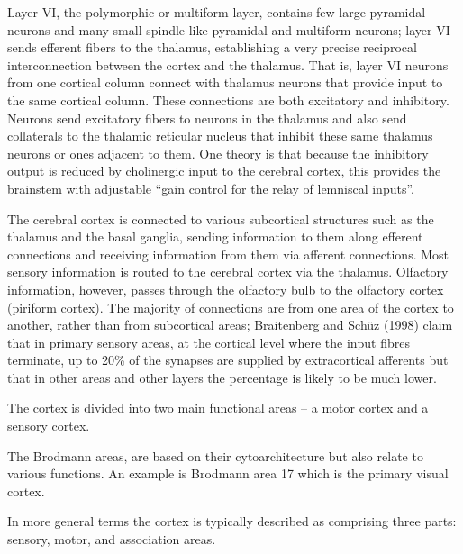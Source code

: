 Layer VI, the polymorphic or multiform layer, contains few large pyramidal neurons and many small spindle-like pyramidal and multiform neurons; layer VI sends efferent fibers to the thalamus, establishing a very precise reciprocal interconnection between the cortex and the thalamus. That is, layer VI neurons from one cortical column connect with thalamus neurons that provide input to the same cortical column. These connections are both excitatory and inhibitory. Neurons send excitatory fibers to neurons in the thalamus and also send collaterals to the thalamic reticular nucleus that inhibit these same thalamus neurons or ones adjacent to them. One theory is that because the inhibitory output is reduced by cholinergic input to the cerebral cortex, this provides the brainstem with adjustable ``gain control for the relay of lemniscal inputs''.

The cerebral cortex is connected to various subcortical structures such as the thalamus and the basal ganglia, sending information to them along efferent connections and receiving information from them via afferent connections. Most sensory information is routed to the cerebral cortex via the thalamus. Olfactory information, however, passes through the olfactory bulb to the olfactory cortex (piriform cortex). The majority of connections are from one area of the cortex to another, rather than from subcortical areas; Braitenberg and Schüz (1998) claim that in primary sensory areas, at the cortical level where the input fibres terminate, up to 20\% of the synapses are supplied by extracortical afferents but that in other areas and other layers the percentage is likely to be much lower.

The cortex is divided into two main functional areas -- a motor cortex and a sensory cortex.

The Brodmann areas, are based on their cytoarchitecture but also relate to various functions. An example is Brodmann area 17 which is the primary visual cortex.

In more general terms the cortex is typically described as comprising three parts: sensory, motor, and association areas.

